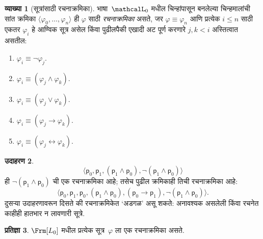 \documentclass[11pt,a4paper,openany]{book}
\theoremstyle{definition}
\newtheorem{defn}{व्याख्या}[section]
\newtheorem{ex}[defn]{उदाहरण}
\newtheorem{prop}[defn]{प्रतिज्ञा}
\newcommand{\tuple}[1]{\langle #1\rangle}
\newcommand{\lif}{\mathbin{\to}}
\newcommand{\liff}{\mathbin{\leftrightarrow}}
\newcommand{\applytofirst}[2]{{\expandafter#1#2}}
\newcommand{\Lang}[1]{\applytofirst{\mathcal}{#1}}
\newcommand{\Obj}[1]{\mathsf{#1}}
\newcommand{\ident}{\equiv}
\begin{document}
\begin{defn}[सूत्रांसाठी रचनाक्रमिका]
\label{pl:syn:fseq:defn:fseq-frm}
भाषा~$\Lang L_0$ मधील चिन्हांपासून बनलेल्या चिन्हमालांची सांत क्रमिका
$\tuple{\varphi_0,\dotsc,\varphi_n}$ ही $\varphi$ साठी \emph{रचनाक्रमिका} असते, जर
$\varphi \ident \varphi_n$ आणि प्रत्येक $i \leq n$ साठी एकतर $\varphi_i$ हे आण्विक
सूत्र असेल किंवा पुढीलपैकी एखादी अट पूर्ण करणारे $j,k < i$ अस्तित्वात
असतील:
\begin{enumerate}
    \item $\varphi_i \ident \lnot \varphi_j$.%
    \item $\varphi_i \ident (\varphi_j \land \varphi_k)$.%
    \item $\varphi_i \ident (\varphi_j \lor \varphi_k)$.%
    \item $\varphi_i \ident (\varphi_j \lif \varphi_k)$.%
    \item $\varphi_i \ident (\varphi_j \liff \varphi_k)$.%
\end{enumerate}
\end{defn}

\begin{ex}
\[
\tuple{
    \Obj p_0,
    \Obj p_1,
    (\Obj p_1 \land \Obj p_0),
    \lnot (\Obj p_1 \land \Obj p_0)
}
\]
ही $\lnot (\Obj p_1 \land \Obj p_0)$ ची एक रचनाक्रमिका आहे; तसेच
पुढील क्रमिकाही तिची रचनाक्रमिका आहे:
\[
\tuple{
    \Obj p_0,
    \Obj p_1,
    \Obj p_0,
    (\Obj p_1 \land \Obj p_0),
    (\Obj p_0 \lif \Obj p_1),
    \lnot (\Obj p_1 \land \Obj p_0)
}.
\]
दुसऱ्या उदाहरणावरून दिसते की रचनाक्रमिकेत `अडगळ' असू शकते: अनावश्यक
असलेली किंवा रचनेत काहीही हातभार न लावणारी सूत्रे.
\end{ex}

\begin{prop}
\label{pl:syn:fseq:prop:formed}
$\Frm[L_0]$ मधील प्रत्येक सूत्र~$\varphi$ ला एक रचनाक्रमिका असते.
\end{prop}
\end{document}
